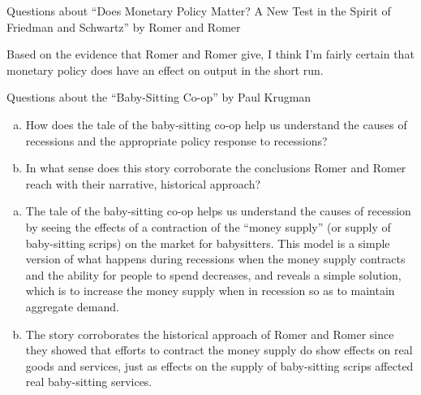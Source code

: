 \documentclass[10pt]{extarticle}
\begin{document}
{\begin{problem}{Questions about ``Does Monetary Policy Matter? A New Test in the Spirit of Friedman and Schwartz'' by Romer and Romer}
\begin{tcolorbox}[colback = white, title = (e), breakable]
\begin{center}
      \end{center}
    \end{tcolorbox}
    \begin{tcolorbox}[colback = white, title = (f), breakable]
      Based on the evidence that Romer and Romer give, I think I'm fairly certain that monetary policy does have an effect on output in the short run.
    \end{tcolorbox}
  \end{problem}
  \begin{problem}{Questions about the ``Baby-Sitting Co-op'' by Paul Krugman}
    \begin{enumerate}[(a)]
      \item How does the tale of the baby-sitting co-op help us understand the causes of recessions and the appropriate policy response to recessions?
      \item In what sense does this story corroborate the conclusions Romer and Romer reach with their narrative, historical approach?
    \end{enumerate}
    \tcblower
    \begin{enumerate}[(a)]
      \item The tale of the baby-sitting co-op helps us understand the causes of recession by seeing the effects of a contraction of the ``money supply'' (or supply of baby-sitting scrips) on the market for babysitters. This model is a simple version of what happens during recessions when the money supply contracts and the ability for people to spend decreases, and reveals a simple solution, which is to increase the money supply when in recession so as to maintain aggregate demand.
      \item The story corroborates the historical approach of Romer and Romer since they showed that efforts to contract the money supply do show effects on real goods and services, just as effects on the supply of baby-sitting scrips affected real baby-sitting services.
    \end{enumerate}
  \end{problem}
}
\end{document}
